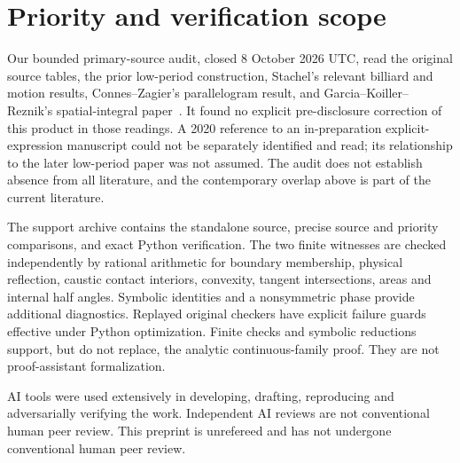 \documentclass[11pt]{article}
\begin{document}
\section{Priority and verification scope}
Our bounded primary-source audit, closed 8 October 2026 UTC, read the original source tables, the prior low-period construction, Stachel's relevant billiard and motion results, Connes--Zagier's parallelogram result, and Garcia--Koiller--Reznik's spatial-integral paper~\cite{stachel,stachelmotion,connes,spatial}. It found no explicit pre-disclosure correction of this product in those readings. A 2020 reference to an in-preparation explicit-expression manuscript could not be separately identified and read; its relationship to the later low-period paper was not assumed. The audit does not establish absence from all literature, and the contemporary overlap above is part of the current literature.

The support archive contains the standalone source, precise source and priority comparisons, and exact Python verification. The two finite witnesses are checked independently by rational arithmetic for boundary membership, physical reflection, caustic contact interiors, convexity, tangent intersections, areas and internal half angles. Symbolic identities and a nonsymmetric phase provide additional diagnostics. Replayed original checkers have explicit failure guards effective under Python optimization. Finite checks and symbolic reductions support, but do not replace, the analytic continuous-family proof. They are not proof-assistant formalization.

AI tools were used extensively in developing, drafting, reproducing and adversarially verifying the work. Independent AI reviews are not conventional human peer review. This preprint is unrefereed and has not undergone conventional human peer review.
\end{document}
